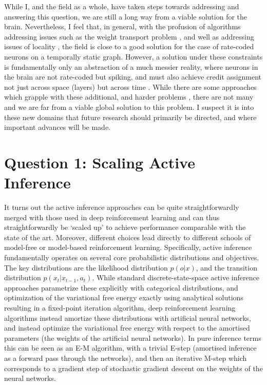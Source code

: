 While I, and the field as a whole, have taken steps towards addressing and answering this question, we are still a long way from a viable solution for the brain. Nevertheless, I feel that, in general, with the profusion of algorithms addressing issues such as the weight transport problem \citep{lillicrap2016random,akrout2019deep,nokland2016direct}, and well as addressing issues of locality \citep{ororbia2019biologically,whittington2017approximation,scellier2016towards}, the field is close to a good solution for the case of rate-coded neurons on a temporally static graph. However, a solution under these constraints is fundamentally only an abstraction of a much messier reality, where neurons in the brain are not rate-coded but spiking, and must also achieve credit assignment not just across space (layers) but across time \citep{lillicrap2020backpropagation}. While there are some approaches which grapple with these additional, and harder problems \citep{zenke2018superspike,bellec2020solution}, there are not many and we are far from a viable global solution to this problem. I suspect it is into these new domains that future research should primarily be directed, and where important advances will be made. 

\section{Question 1: Scaling Active Inference}

It turns out the active inference approaches can be quite straightforwardly merged with those used in deep reinforcement learning and can thus straightforwardly be `scaled up' to achieve performance comparable with the state of the art. Moreover, different choices lead directly to different schools of model-free or model-based reinforcement learning. Specifically, active inference fundamentally operates on several core probabilistic distributions and objectives. The key distributions are the likelihood distribution $p(o | x)$, and the transition distribution $p(x_t | x_{t-1},a_t)$. While standard discrete-state-space active inference approaches parametrize these explicitly with categorical distributions, and optimization of the variational free energy exactly using analytical solutions resulting in a fixed-point iteration algorithm, deep reinforcement learning algorithms instead amortize these distributions with artificial neural networks, and instead optimize the variational free energy with respect to the amortised parameters (the weights of the artificial neural networks). In pure inference terms this can be seen as an E-M algorithm, with a trivial E-step (amortised inference as a forward pass through the networks), and then an iterative M-step which corresponds to a gradient step of stochastic gradient descent on the weights of the neural networks. 

